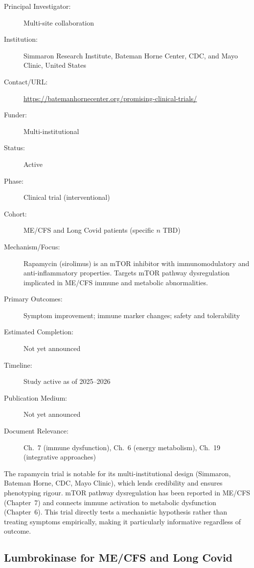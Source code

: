 \begin{description}
    \item[Principal Investigator:] Multi-site collaboration
    \item[Institution:] Simmaron Research Institute, Bateman Horne Center,
        CDC, and Mayo Clinic, United States
    \item[Contact/URL:] \url{https://batemanhornecenter.org/promising-clinical-trials/}
    \item[Funder:] Multi-institutional
    \item[Status:] Active
    \item[Phase:] Clinical trial (interventional)
    \item[Cohort:] ME/CFS and Long Covid patients (specific $n$ TBD)
    \item[Mechanism/Focus:] Rapamycin (sirolimus) is an mTOR inhibitor with
        immunomodulatory and anti-inflammatory properties.  Targets mTOR
        pathway dysregulation implicated in ME/CFS immune and metabolic
        abnormalities.
    \item[Primary Outcomes:] Symptom improvement; immune marker changes;
        safety and tolerability
    \item[Estimated Completion:] Not yet announced
    \item[Timeline:] Study active as of 2025--2026
    \item[Publication Medium:] Not yet announced
    \item[Document Relevance:] Ch.~7 (immune dysfunction), Ch.~6 (energy
        metabolism), Ch.~19 (integrative approaches)
\end{description}

The rapamycin trial is notable for its multi-institutional design (Simmaron,
Bateman Horne, CDC, Mayo Clinic), which lends credibility and ensures
phenotyping rigour.  mTOR pathway dysregulation has been reported in ME/CFS
(Chapter~7) and connects immune activation to metabolic dysfunction
(Chapter~6).  This trial directly tests a mechanistic hypothesis rather than
treating symptoms empirically, making it particularly informative regardless of
outcome.

\subsection{Lumbrokinase for ME/CFS and Long Covid}
\label{sec:registry-lumbrokinase}

